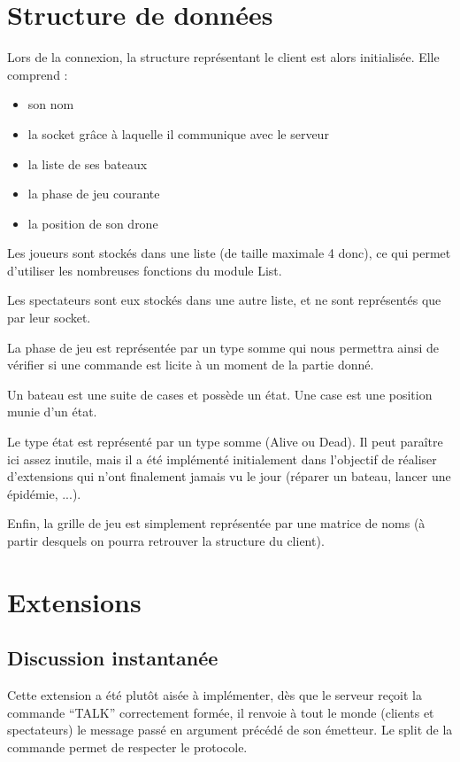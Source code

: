 \documentclass[a4paper, 11pt]{report}
\begin{document}
\section{Structure de données}

Lors de la connexion, la structure représentant le client est alors initialisée. Elle comprend :
\begin{itemize}
\item son nom
\item la socket grâce à laquelle il communique avec le serveur
\item la liste de ses bateaux
\item la phase de jeu courante
\item la position de son drone
\end{itemize}

Les joueurs sont stockés dans une liste (de taille maximale 4 donc), ce qui permet d'utiliser les nombreuses fonctions du module List.

Les spectateurs sont eux stockés dans une autre liste, et ne sont représentés que par leur socket.

La phase de jeu est représentée par un type somme qui nous permettra ainsi de vérifier si une commande est licite à un moment de la partie donné.

Un bateau est une suite de cases et possède un état.
Une case est une position munie d'un état.

Le type état est représenté par un type somme (Alive ou Dead). Il peut paraître ici assez inutile, mais il a été implémenté initialement dans l'objectif de réaliser d'extensions qui n'ont finalement jamais vu le jour (réparer un bateau, lancer une épidémie, ...).

Enfin, la grille de jeu est simplement représentée par une matrice de noms (à partir desquels on pourra retrouver la structure du client).

\section{Extensions}

\subsection{Discussion instantanée}

Cette extension a été plutôt aisée à implémenter, dès que le serveur reçoit la commande ``TALK'' correctement formée, il renvoie à tout le monde (clients et spectateurs) le message passé en argument précédé de son émetteur. Le split de la commande permet de respecter le protocole.
\end{document}
